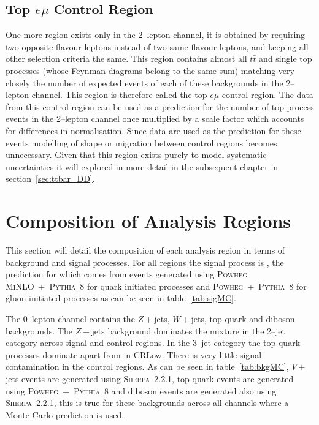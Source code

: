 \subsection{Top \texorpdfstring{$e \mu$}{e mu} Control Region}%
\label{sec:topemucr}

One more region exists only in the 2--lepton channel, it is obtained by
requiring two opposite flavour leptons instead of two same flavour leptons, and
keeping all other selection criteria the same. This region contains almost all
$t\bar{t}$ and single top processes (whose Feynman diagrams belong to the same
sum) matching very closely the number of expected events of each of these
backgrounds in the 2--lepton channel. This region is therefore called the top $e
\mu$ control region. The data from this control region can be used as a
prediction for the number of top process events in the 2--lepton channel once
multiplied by a scale factor which accounts for differences in normalisation.
Since data are used as the prediction for these events modelling of shape or
migration between control regions becomes unnecessary. Given that this region
exists purely to model systematic uncertainties it will explored in more detail
in the subsequent chapter in section~\ref{sec:ttbar_DD}.

\section{Composition of Analysis Regions}
\label{sec:composition}

This section will detail the composition of each analysis region in terms of
background and signal processes. For all regions the signal process is
\VHbb, the prediction for which comes from events generated using \textsc{Powheg
  MiNLO}~+~\textsc{Pythia~8} for quark initiated processes and
\textsc{Powheg}~+~\textsc{Pythia~8} for gluon initiated processes as can be seen
in table~\ref{tab:sigMC}.


The 0--lepton channel contains the  $Z + $jets, $W+$jets, top quark and
diboson backgrounds. The $Z+$jets background dominates the mixture in the
2--jet category across signal and control regions. In the 3--jet category the
top-quark processes dominate apart from in CRLow. There is very little signal
contamination in the control regions. As can be seen in table~\ref{tab:bkgMC},
$V+$jets events are generated using \textsc{Sherpa~2.2.1}, top quark events
are generated using \textsc{Powheg}~+~\textsc{Pythia~8} and diboson events are
generated also using \textsc{Sherpa~2.2.1}, this is true for these backgrounds
across all channels where a Monte-Carlo prediction is used.


